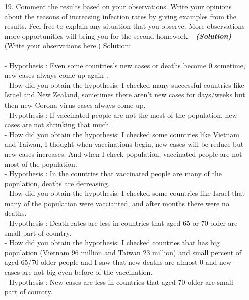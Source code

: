 \documentclass[a4 paper]{article}
\numberwithin{equation}{section}
\newcommand{\solution}{~\newline\textbf{\textit{(Solution)}} }
\newcommand{\0}{\mathbf{0}}
\begin{document}
\begin{itemize}
\begin{table}[ht]
\begin{tabular}{c c c c c c c}
			\hline %
		\end{tabular}\label{table:nonlin}%
	\end{table}
	\item[19. ] Comment the results based on your observations. Write your opinions about the reasons of increasing infection rates by giving examples from the results. Feel free to explain any situation that you observe. More observations more opportunities will bring you for the second homework. 
	\solution (Write your observations here.)
	\newpage 
	Solution: \\ \\
	- Hypothesis : Even some countries's new cases or deaths become 0 sometime, new cases always come up again .\\
- How did you obtain the hypothesis: I checked many successful countries like Israel and New Zealand, sometimes there aren't new cases for days/weeks but then new Corona virus cases always come up. 
\newline \\
- Hypothesis : If vaccinated people are not the most of the population, new cases are not shrinking that much. \\
- How did you obtain the hypothesis: I checked some countries like Vietnam and Taiwan, I thought when vaccinations begin, new cases will be reduce but new cases increases. And when I check population, vaccinated people are not most of the population.
\newline \\
- Hypothesis : In the countries that vaccinated people are many of the population, deaths are decreasing.\\
- How did you obtain the hypothesis: I checked some countries like Israel that many of the population were vaccianted, and after months there were no deaths.
\newline \\
- Hypothesis : Death rates are less in countries that aged 65 or 70 older are small part of country.\\
- How did you obtain the hypothesis: I checked countries that has big population (Vietnam 96 million and Taiwan 23 million) and small percent of aged 65/70 older people and I saw that new deaths are almost 0 and new cases are not big even before of the vaccination.
\newline \\
- Hypothesis : New cases are less in countries that aged 70 older are small part of country.\\

\end{itemize}
\end{document}

